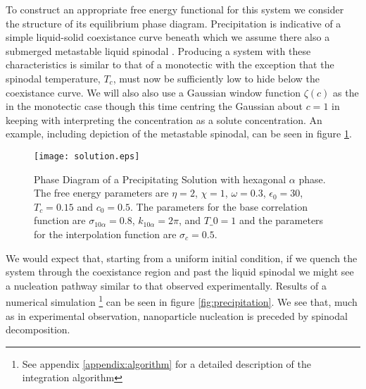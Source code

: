 To construct an appropriate free energy functional for this system we consider
the structure of its equilibrium phase diagram. Precipitation is indicative of
a simple liquid-solid coexistance curve beneath which we assume there also a
submerged metastable liquid spinodal \cite{DAVEY13}. Producing a system with
these characteristics is similar to that of a monotectic with the exception
that the spinodal temperature, $T_c$, must now be sufficiently low to hide
below the coexistance curve. We will also also use a Gaussian window function
$\zeta(c)$ as the in the monotectic case though this time centring the Gaussian
about $c = 1$ in keeping with interpreting the concentration as a solute
concentration.  An example, including depiction of the metastable spinodal, can
be seen in figure \ref{fig:precip_phase_dia}.

\begin{figure}
    \centering	
    \texttt{[image: solution.eps]}
    \caption[Coexistance Phase Diagram with Metastable Spinodal]{
        \label{fig:precip_phase_dia} Phase Diagram of a Precipitating Solution
        with hexagonal $\alpha$ phase. The free energy parameters are $\eta =
        2$, $\chi = 1$, $\omega=0.3$, $\epsilon_0=30$, $T_c = 0.15$ and
        $c_0=0.5$. The parameters for the base correlation function are
        $\sigma_{10\alpha} = 0.8$, $k_{10\alpha} = 2\pi$, and $T\_0 = 1$ and
        the parameters for the interpolation function are $\sigma_c = 0.5$.
    }
\end{figure}

We would expect that, starting from a uniform initial condition, if we quench
the system through the coexistance region and past the liquid spinodal we might
see a nucleation pathway similar to that observed experimentally. Results of a
numerical simulation \footnote{See appendix \ref{appendix:algorithm} for a
detailed description of the integration algorithm} can be seen in figure
\ref{fig:precipitation}. We see that, much as in experimental observation,
nanoparticle nucleation is preceded by spinodal decomposition.

